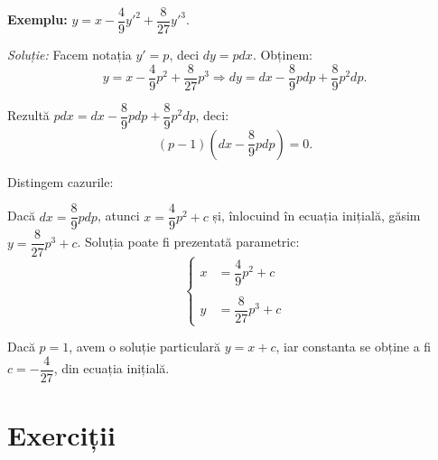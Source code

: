 \textbf{Exemplu:} $y = x - \dfrac{4}{9} {y'}^2 + \dfrac{8}{27} {y'}^3$.

\emph{Soluție:} Facem notația $y' = p$, deci $dy = pdx$. Obținem:
\[
  y = x - \frac{4}{9} p^2 + \frac{8}{27} p^3 \Rightarrow %
  dy = dx - \frac{8}{9} pdp + \frac{8}{9} p^2 dp.
\]

Rezultă $pdx = dx - \dfrac{8}{9} pdp + \dfrac{8}{9} p^2 dp$, deci:
\[
  (p - 1)(dx - \frac{8}{9} pdp) = 0.
\]

Distingem cazurile:

Dacă $dx = \dfrac{8}{9} pdp$, atunci $x = \dfrac{4}{9} p^2 + c$ și, înlocuind în
ecuația inițială, găsim $y = \dfrac{8}{27} p^3 + c$. Soluția poate fi prezentată parametric:
\[
  \begin{cases}
    x &= \dfrac{4}{9} p^2 + c \\
      & \\
    y &= \dfrac{8}{27} p^3 + c
  \end{cases}
\]

Dacă $p = 1$, avem o soluție particulară $y = x + c$, iar constanta se obține a fi $c = -\dfrac{4}{27}$,
din ecuația inițială.



\section{Exerciții}

